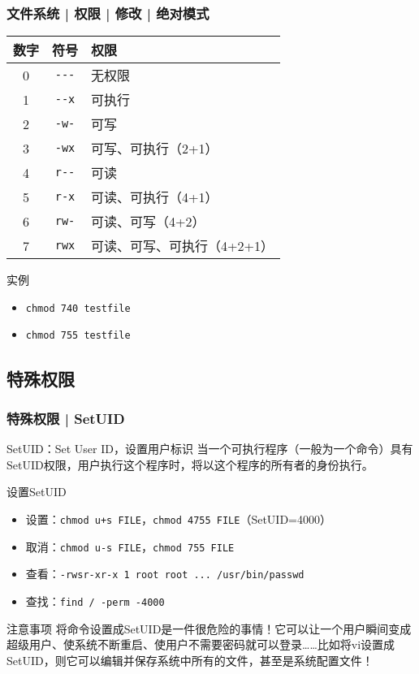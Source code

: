 \begin{frame}[fragile]
  \frametitle{文件系统 | 权限 | 修改 | \alert{绝对模式}}
  \begin{table}
    \centering
    \begin{tabular}{ccl}
      \hline
      \rowcolor{blue!50}数字 & 符号 & 权限\\
      \hline
      0 & \verb|---| & 无权限\\
      1 & \verb|--x| & 可执行\\
      2 & \verb|-w-| & 可写\\
      3 & \verb|-wx| & 可写、可执行（2+1）\\
      4 & \verb|r--| & 可读\\
      5 & \verb|r-x| & 可读、可执行（4+1）\\
      6 & \verb|rw-| & 可读、可写（4+2）\\
      7 & \verb|rwx| & 可读、可写、可执行（4+2+1）\\
      \hline
    \end{tabular}
  \end{table}
  \pause
  \begin{block}{实例}
    \begin{itemize}
      \item \verb|chmod 740 testfile|
      \item \verb|chmod 755 testfile|
    \end{itemize}
  \end{block}
\end{frame}

\subsection{特殊权限}
\begin{frame}[fragile]
  \frametitle{特殊权限 | SetUID}
  \begin{block}{SetUID：Set User ID，设置用户标识}
    当一个可执行程序（一般为一个命令）具有SetUID权限，用户执行这个程序时，将以这个程序的所有者的身份执行。
  \end{block}
  \pause
  \begin{block}{设置SetUID}
    \begin{itemize}
      \item 设置：\verb|chmod u+s FILE|，\verb|chmod 4755 FILE|（SetUID=4000）
      \item 取消：\verb|chmod u-s FILE|，\verb|chmod 755 FILE|
      \item 查看：\verb|-rwsr-xr-x 1 root root ... /usr/bin/passwd|
      \item 查找：\verb|find / -perm -4000|
    \end{itemize}
  \end{block}
  \pause
  \begin{block}{注意事项}
    将命令设置成SetUID是一件很危险的事情！它可以让一个用户瞬间变成超级用户、使系统不断重启、使用户不需要密码就可以登录……比如将vi设置成SetUID，则它可以编辑并保存系统中所有的文件，甚至是系统配置文件！
  \end{block}
\end{frame}

